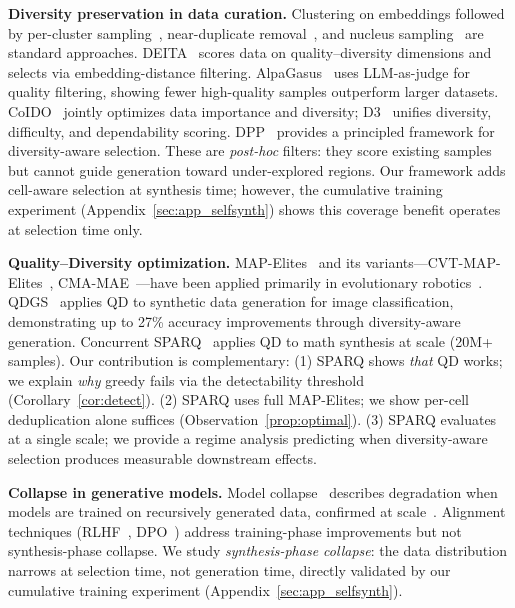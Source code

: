 \documentclass{article}
\theoremstyle{plain}
\theoremstyle{remark}
\begin{document}
\textbf{Diversity preservation in data curation.}
Clustering on embeddings followed by per-cluster sampling~\citep{cluster_sampling_2022}, near-duplicate removal~\citep{dedup_2023}, and nucleus sampling~\citep{temperature_sampling_2023} are standard approaches.
DEITA~\citep{liu2024deita} scores data on quality--diversity dimensions and selects via embedding-distance filtering.
AlpaGasus~\citep{chen2024alpagasus} uses LLM-as-judge for quality filtering, showing fewer high-quality samples outperform larger datasets.
CoIDO~\citep{wang2025coido} jointly optimizes data importance and diversity; D3~\citep{d3_2025} unifies diversity, difficulty, and dependability scoring.
DPP~\citep{kulesza2012dpp} provides a principled framework for diversity-aware selection.
These are \emph{post-hoc} filters: they score existing samples but cannot guide generation toward under-explored regions.
Our framework adds cell-aware selection at synthesis time; however, the cumulative training experiment (Appendix~\ref{sec:app_selfsynth}) shows this coverage benefit operates at selection time only.

\textbf{Quality--Diversity optimization.}
MAP-Elites~\citep{mouret_2015} and its variants---CVT-MAP-Elites~\citep{fontaine_2020}, CMA-MAE~\citep{cma_mae_2022}---have been applied primarily in evolutionary robotics~\citep{qd_robotics_2020}.
QDGS~\citep{um2024qdgs} applies QD to synthetic data generation for image classification, demonstrating up to 27\% accuracy improvements through diversity-aware generation.
Concurrent SPARQ~\citep{sparq_2025} applies QD to math synthesis at scale (20M+ samples).
Our contribution is complementary: (1) SPARQ shows \emph{that} QD works; we explain \emph{why} greedy fails via the detectability threshold (Corollary~\ref{cor:detect}). (2) SPARQ uses full MAP-Elites; we show per-cell deduplication alone suffices (Observation~\ref{prop:optimal}). (3) SPARQ evaluates at a single scale; we provide a regime analysis predicting when diversity-aware selection produces measurable downstream effects.

\textbf{Collapse in generative models.}
Model collapse~\citep{model_collapse_2023} describes degradation when models are trained on recursively generated data, confirmed at scale~\citep{data_collapse_2024}.
Alignment techniques (RLHF~\citep{ouyang2022training}, DPO~\citep{rafailov2023dpo}) address training-phase improvements but not synthesis-phase collapse.
We study \emph{synthesis-phase collapse}: the data distribution narrows at selection time, not generation time, directly validated by our cumulative training experiment (Appendix~\ref{sec:app_selfsynth}).
\end{document}
